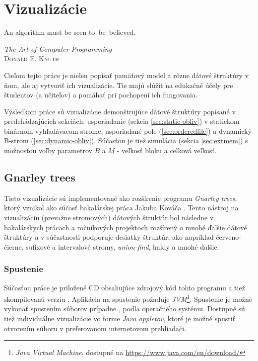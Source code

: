 \chapter{Vizualizácie}
\epigraph{An algorithm must be seen to~be~believed.}{\textit{The Art of Computer Programming}\\ \textsc{Donald E. Knuth}}

Cieľom tejto práce je nielen popísať \obliv pamäťový model a rôzne dátové štruktúry v ňom, ale aj vytvoriť ich vizualizácie. Tie majú slúžiť na edukačné účely pre študentov (a učiteľov) a pomáhať pri pochopení ich fungovania.

Výsledkom práce sú vizualizácie demonštrujúce dátové štruktúry popísané v predchádzajúcich sekciách:  usporiadanie (sekcia \ref{sec:static-obliv}) v statickom binárnom vyhľadávacom strome, usporiadané pole (\ref{sec:orderedfile}) a dynamický B-strom (\ref{sec:dynamic-obliv}). Súčasťou je tiež simulácia \cache (sekcia \ref{sec:extmem}) s možnosťou voľby parametrov $B$ a $M$ - veľkosť bloku a celková veľkosť.

\section{Gnarley trees}
Tieto vizualizácie sú implementované ako rozšírenie programu \emph{Gnarley trees}, ktorý vznikol ako súčasť bakalárskej práca Jakuba Kováča \citep{algviskuko}. Tento nástroj na vizualizáciu (prevažne stromových) dátových štruktúr bol následne v bakalárskych prácach \citep{algviskotrlova, algvistomkovic, algvislukca} a ročníkových projektoch rozšírený o mnohé ďalšie dátové štruktúry a v súčastnosti podporuje desiatky štruktúr, ako napríklad červeno-čierne, sufixové a intervalové stromy, \emph{union-find}, haldy a mnohé ďalšie.

\subsection{Spustenie}
Súčasťou práce je priložené CD obsahujúce zdrojový kód \citep{attsource} tohto programu a tiež skompilovanú verziu \citep{attbin}. Aplikácia na spustenie požaduje \emph{JVM}\footnote{\emph{Java Virtual Machine}, dostupné na \url{https://www.java.com/en/download/}}. Spustenie je možné vykonať spustením súborov  prípadne , podla operačného systému. Dostupné sú tiež individuálne vizualizácie vo forme \emph{Java appletov}, ktoré je možné spustiť otvorením súboru  v preferovanom internetovom prehliadači.

